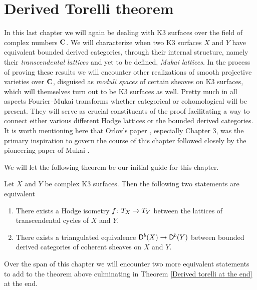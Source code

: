\section{Derived Torelli theorem}
\label{Chapter: Derived Torelli theorem}

In this last chapter we will again be dealing with K3 surfaces over the field of complex numbers $\mathbf C$. We will characterize when two K3 surfaces $X$ and $Y$ have equivalent bounded derived categories, through their internal structure, namely their \emph{transcendental lattices} and yet to be defined, \emph{Mukai lattices}. In the process of proving these results we will encounter other realizations of smooth projective varieties over $\mathbf C$, disguised as \emph{moduli spaces} of certain sheaves on K3 surfaces, which will themselves turn out to be K3 surfaces as well.
Pretty much in all aspects Fourier--Mukai transforms whether categorical or cohomological will be present. They will serve as crucial constituents of the proof facilitating a way to connect either various different Hodge lattices or the bounded derived categories. It is worth mentioning here that Orlov's paper \cite[]{Orlov2003}, especially Chapter 3, was the primary inspiration to govern the course of this chapter followed closely by the pioneering paper of Mukai \cite{Mukai1987}.

We will let the following theorem be our initial guide for this chapter.
\begin{theorem}
    \label{transc iso iff der equiv}
    Let $X$ and $Y$ be complex K3 surfaces. Then the following two statements are equivalent
    \begin{enumerate}[label = (\roman*)]
        \item{There exists a Hodge isometry $f \colon T_{X} \to T_{Y}$ between the lattices of transcendental cycles of $X$ and $Y$.}
        \item{There exists a triangulated equivalence $\mathsf{D}^b(X) \to \mathsf{D}^b(Y)$ between bounded derived categories of coherent sheaves on $X$ and $Y$.} 
    \end{enumerate}
\end{theorem}
Over the span of this chapter we will encounter two more equivalent statements to add to the theorem above
culminating in Theorem \ref{Derived torelli at the end} at the end. 


